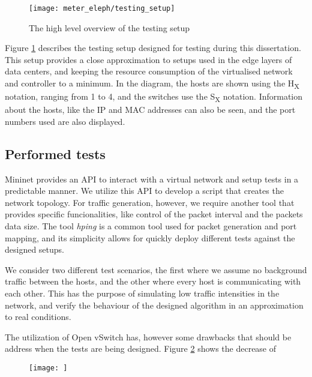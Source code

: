 \pagebreak

\begin{figure} 
    \centering
    \texttt{[image: meter\_eleph/testing\_setup]}
    \caption {The high level overview of the testing setup}
    \label{fig:test_setup}
\end{figure} 

\par Figure \ref{fig:test_setup} describes the testing setup designed for testing during this dissertation. This setup provides a close approximation to setups used in the edge layers of data centers, and keeping the
resource consumption of the virtualised network and controller to a minimum. In the diagram, the hosts are shown using the H\textsubscript{X} notation, ranging from 1 to 4, and the switches use the S\textsubscript{X} 
notation. Information about the hosts, like the IP and MAC addresses can also be seen, and the port numbers used are also displayed.

\subsection{Performed tests}

Mininet provides an API to interact with a virtual network and setup tests in a predictable manner. We utilize this API to develop a script that creates the network topology. For traffic generation, however, we require another tool that provides 
specific funcionalities, like control of the packet interval and the packets data size. The tool \textit{hping} is a common tool used for packet generation and port mapping, and its simplicity allows for quickly deploy different tests
against the designed setups.

\par We consider two different test scenarios, the first where we assume no background traffic between the hosts, and the other where every host is communicating with each other. This has the purpose of simulating low traffic intensities in the network,
and verify the behaviour of the designed algorithm in an approximation to real conditions.

\par The utilization of Open vSwitch has, however some drawbacks that should be address when the tests are being designed. Figure \ref{fig:ovs_packet_loss} shows the decrease of 

\begin{figure} 
    \centering
    \texttt{[image: ]}
    \caption {}
    \label{fig:ovs_packet_loss}
\end{figure} 

